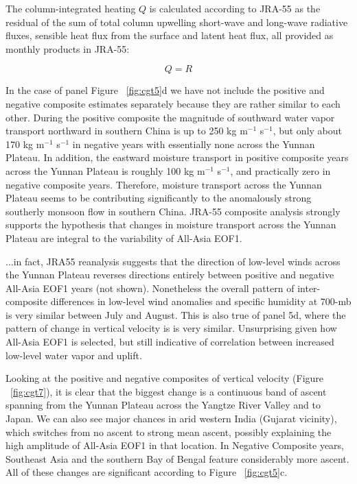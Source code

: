 	The column-integrated heating $Q$ is calculated according to JRA-55 as the residual of the sum of total column upwelling short-wave and long-wave radiative fluxes, sensible heat flux from the surface and latent heat flux, all provided as monthly products in JRA-55:
	
\begin{equation}
	Q=R
\end{equation}
	
	In the case of panel Figure ~\ref{fig:cgt5}d we have not include the positive and negative composite estimates separately because they are rather similar to each other. During the positive composite the magnitude of southward water vapor transport northward in southern China is up to 250 kg m$^{-1}$ s$^{-1}$, but only about 170 kg m$^{-1}$ s$^{-1}$ in negative years with essentially none across the Yunnan Plateau.  In addition, the eastward moisture transport in positive composite years across the Yunnan Plateau is roughly 100 kg m$^{-1}$ s$^{-1}$, and practically zero in negative composite years. Therefore, moisture transport across the Yunnan Plateau seems to be contributing significantly to the anomalously strong southerly monsoon flow in southern China. JRA-55 composite analysis strongly supports the hypothesis that changes in moisture transport across the Yunnan Plateau are integral to the variability of All-Asia EOF1.
						
	...in fact, JRA55 reanalysis suggests that the direction of low-level winds across the Yunnan Plateau reverses directions entirely between positive and negative All-Asia EOF1 years (not shown). Nonetheless the overall pattern of inter-composite differences in low-level wind anomalies and specific humidity at 700-mb is very similar between July and August. This is also true of panel 5d, where the pattern of change in vertical velocity is is very similar. Unsurprising given how All-Asia EOF1 is selected, but still indicative of correlation between increased low-level water vapor and uplift.
			
	Looking at the positive and negative composites of vertical velocity (Figure ~\ref{fig:cgt7}), it is clear that the biggest change is a continuous band of ascent spanning from the Yunnan Plateau across the Yangtze River Valley and to Japan. We can also see major chances in arid western India (Gujarat vicinity), which switches from no ascent to strong mean ascent, possibly explaining the high amplitude of All-Asia EOF1 in that location. In Negative Composite years, Southeast Asia and the southern Bay of Bengal feature considerably more ascent. All of these changes are significant according to Figure ~\ref{fig:cgt5}c.
	
